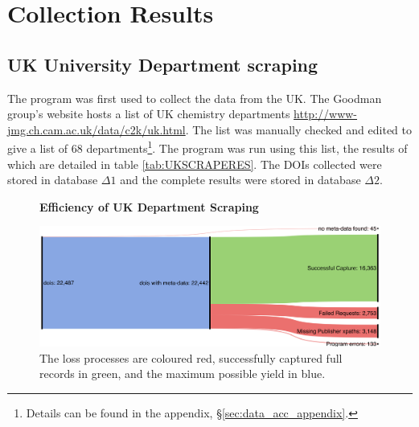 \section{Collection Results}
\subsection{UK University Department scraping}
\label{sec:UKSCRAPE}
The program was first used to collect the data from the UK. The Goodman group's website hosts a list of UK chemistry departments \url{http://www-jmg.ch.cam.ac.uk/data/c2k/uk.html}. The list was manually checked and edited to give a list of 68 departments\footnote{Details can be found in the appendix, \S\ref{sec:data_acc_appendix}.}. The program was run using this list, the results of which are detailed in table \ref{tab:UKSCRAPERES}. The DOIs collected were stored in database $\Delta1$ and the complete results were stored in database $\Delta2$.


\newpage
\begin{figure}[H]
    \centering
    \textbf{Efficiency of UK Department Scraping}\par\medskip
    \includegraphics[width=\textwidth]{Data_Acquisition/uk_sankey.png}
    \caption[Efficiency of UK Department Scraping]{The loss processes are coloured red, successfully captured full records in green, and the maximum possible yield in blue.}
     \label{fig:UKSANK}
\end{figure}
\newpage

